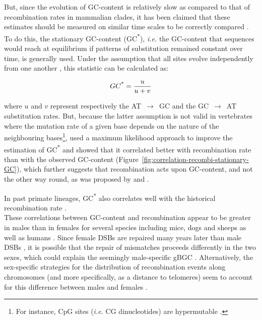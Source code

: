 But, since the evolution of GC-content is relatively slow as compared to that of recombination rates in mammalian clades, it has been claimed that these estimates should be measured on similar time scales to be correctly compared \citep{duret2009biased}.
To do this, the stationary GC-content (GC\textsuperscript{*}), \textit{i.e.} the GC-content that sequences would reach at equilibrium if patterns of substitution remained constant over time, is generally used.
Under the assumption that all sites evolve independently from one another \citep{sueoka1962genetic}, this statistic can be calculated as:

\begin{equation*}
	GC\textsuperscript{*} = \frac{u}{u+v}
\end{equation*}

where $u$ and $v$ represent respectively the AT~$\rightarrow$~GC and the GC~$\rightarrow$~AT substitution rates.
But, because the latter assumption is not valid in vertebrates where the mutation rate of a given base depends on the nature of the neighbouring bases\footnote{For instance, CpG sites (\textit{i.e.} CG dinucleotides) are hypermutable \citep{arndt2003distinct}.}, \citet{duret2008impact} used a maximum likelihood approach to improve the estimation of GC\textsuperscript{*} and showed that it correlated better with recombination rate than with the observed GC-content (Figure~\ref{fig:correlation-recombi-stationary-GC}), which further suggests that recombination acts upon GC-content, and not the other way round, as was proposed by \citet{gerton2000global,blat2002physical} and \citet{petes2002context}.

In past primate lineages, GC\textsuperscript{*} also correlates well with the historical recombination rate \citep{munch2014finescale,lesecque2014red}.\\



These correlations between GC-content and recombination appear to be greater in males than in females for several species including mice, dogs and sheeps \citep{popa2012sexspecific} as well as humans \citep{webster2005maledriven, dreszer2007biased, duret2008impact}.
Since female DSBs are repaired many years later than male DSBs \citep{coop2007evolutionary}, it is possible that the repair of mismatches proceeds differently in the two sexes, which could explain the seemingly male-specific gBGC \citep{duret2009biased}.
Alternatively, the sex-specific strategies for the distribution of recombination events along chromosomes (and more specifically, as a distance to telomeres) seem to account for this difference between males and females \citep{popa2012sexspecific}.


